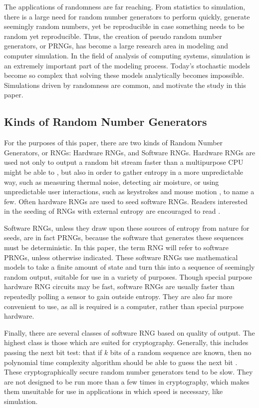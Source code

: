 The applications of randomness are far reaching. From statistics to simulation, there is a large need for random number generators to perform quickly, generate seemingly random numbers, yet be reproducible in case something needs to be random yet reproducible. Thus, the creation of pseudo random number generators, or PRNGs, has become a large research area in modeling and computer simulation. In the field of analysis of computing systems, simulation is an extremely important part of the modeling process. Today's stochastic models become so complex that solving these models analytically becomes impossible. Simulations driven by randomness are common, and motivate the study in this paper.

\subsection{Kinds of Random Number Generators}
For the purposes of this paper, there are two kinds of Random Number Generators, or RNGs: Hardware RNGs, and Software RNGs. Hardware RNGs are used not only to output a random bit stream faster than a multipurpose CPU might be able to \cite{Saiprasert:2010:OHA:1857927.1857929,Barel:1983:FHR:800042.801454}, but also in order to gather entropy in a more unpredictable way, such as measuring thermal noise, detecting air moisture, or using unpredictable user interactions, such as keystrokes and mouse motion , to name a few. Often hardware RNGs are used to seed software RNGs. Readers interested in the seeding of RNGs with external entropy are encouraged to read \cite{Hennebert:2013:EHP:2462096.2462122}.

Software RNGs, unless they draw upon these sources of entropy from nature for seeds, are in fact PRNGs, because the software that generates these sequences must be deterministic. In this paper, the term RNG will refer to software PRNGs, unless otherwise indicated. These software RNGs use mathematical models to take a finite amount of state and turn this into a sequence of seemingly random output, suitable for use in a variety of purposes. Though special purpose hardware RNG circuits may be fast, software RNGs are usually faster than repeatedly polling a sensor to gain outside entropy. They are also far more convenient to use, as all is required is a computer, rather than special purpose hardware.

Finally, there are several classes of software RNG based on quality of output. The highest class is those which are suited for cryptography. Generally, this includes passing the next bit test: that if $k$ bits of a random sequence are known, then no polynomial time complexity algorithm should be able to guess the next bit \cite{Yao_1982}. These cryptographically secure random number generators tend to be slow. They are not designed to be run more than a few times in cryptography, which makes them unsuitable for use in applications in which speed is necessary, like simulation.

